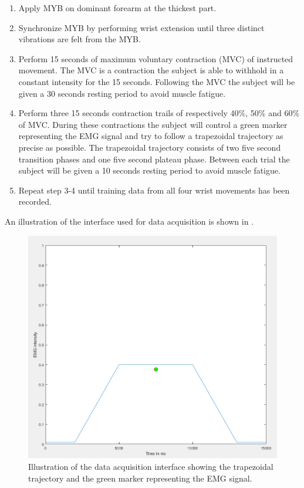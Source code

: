 \begin{enumerate}
	\item Apply MYB on dominant forearm at the thickest part.
	\item Synchronize MYB by performing wrist extension until three distinct vibrations are felt from the MYB.
	\item Perform 15 seconds of maximum voluntary contraction (MVC) of instructed movement. The MVC is a contraction the subject is able to withhold in a constant intensity for the 15 seconds. Following the MVC the subject will be given a 30 seconds resting period to avoid muscle fatigue.
	\item Perform three 15 seconds contraction trails of respectively 40\%, 50\% and 60\% of MVC. During these contractions the subject will control a green marker representing the EMG signal and try to follow a trapezoidal trajectory as precise as possible. The trapezoidal trajectory consists of two five second transition phases and one five second plateau phase. Between each trial the subject will be given a 10 seconds resting period to avoid muscle fatigue.
	\item Repeat step 3-4 until training data from all four wrist movements has been recorded.
\end{enumerate}

An illustration of the interface used for data acquisition is shown in .

\begin{figure}[H]                 
	\includegraphics[width=.6\textwidth]{figures/xBackground/dataacqGUI}  
	\caption{Illustration of the data acquisition interface showing the trapezoidal trajectory and the green marker representing the EMG signal.}
	\label{fig:dataacqGUI} 
\end{figure}

